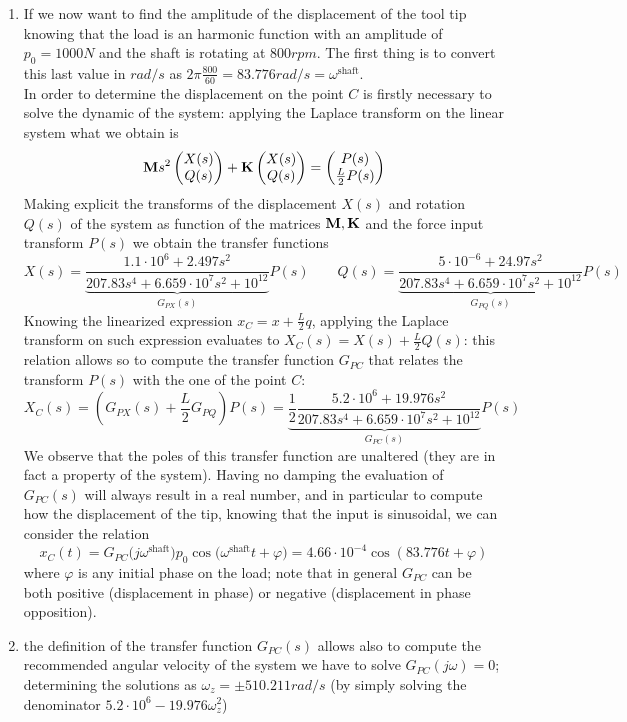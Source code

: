 \begin{enumerate}[\itshape i)]
			\item If we now want to find the amplitude of the displacement of the tool tip 	knowing that the load is an harmonic function with an amplitude of $p_0 = 1000N$ and the shaft is rotating at $800rpm$. The first thing is to convert this last value in $rad/s$ as $2\pi\frac{800}{60} = 83.776rad /s= \omega^\textrm{shaft}$. \\
			In order to determine the displacement on the point $C$ is firstly necessary to solve the dynamic of the system: applying the Laplace transform on the linear system what we obtain is 
			\[ \mathbf{M} s^2 \begin{pmatrix} X(s) \\ Q(s) \end{pmatrix} + \mathbf{K} \begin{pmatrix} X(s) \\ Q(s) \end{pmatrix} = \begin{pmatrix} P(s) \\ \frac L2 P(s)	 \end{pmatrix} \]
			Making explicit the transforms of the displacement $X(s)$ and rotation $Q(s)$ of the system as function of the matrices $\mathbf{M},\mathbf{K}$ and the force input transform $P(s)$ we obtain the transfer functions
			\[ 	X(s) = \underbrace{ \frac{1.1\cdot 10^6 + 2.497s^2}{207.83 s^4 + 6.659\cdot 10^7 s^2 + 10^{12}} }_{G_{PX}(s)} P(s) \qquad Q(s) = \underbrace{ \frac{ 5\cdot 10^{-6} + 24.97s^2 }{207.83 s^4 + 6.659\cdot 10^7 s^2 + 10^{12}} }_{G_{PQ}(s)} P(s) \]
			Knowing the linearized expression $x_C = x + \frac L 2 q$, applying the Laplace transform on such expression evaluates to $X_C(s) = X(s) + \frac L 2 Q(s)$: this relation allows so to compute the transfer function $G_{PC}$ that relates the transform $P(s)$ with the one of the point $C$:
			\[ X_C(s) = \left( G_{PX}(s) + \frac L 2 G_{PQ}\right) P(s)  =  \underbrace{ \frac 1 2 \frac{ 5.2 \cdot 10^6 + 19.976s^2 }{207.83 s^4 + 6.659\cdot 10^7 s^2 + 10^{12}} }_{G_{PC}(s)} P(s) \]
			We observe that the poles of this transfer function are unaltered (they are in fact a property of the system). Having no damping the evaluation of $G_{PC}(s)$ will always result in a real number, and in particular to compute how the displacement of the tip, knowing that the input is sinusoidal, we can consider the relation
			\[ x_C(t) = G_{PC}\big(j \omega^\textrm{shaft}\big) p_0 \cos\big(\omega^\textrm{shaft} t + \varphi\big) = 4.66\cdot 10^{-4} \cos(83.776 t + \varphi) \]
			where $\varphi$ is any initial phase on the load; note that in general $G_{PC}$ can be both positive (displacement in phase) or negative (displacement in phase opposition).
			
			\item the definition of the transfer function $G_{PC}(s)$ allows also to compute the recommended angular velocity of the system we have to solve $G_{PC}(j\omega) = 0$; determining the solutions as $\omega_z = \pm 510.211 rad/s$ (by simply solving the denominator $5.2\cdot 10^6 - 19.976 \omega_z^2$)
			
			
		\end{enumerate}
		
		
		